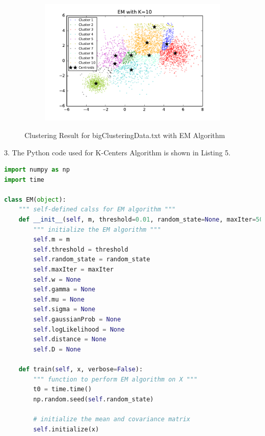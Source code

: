 \begin{description}
\begin{description}
\begin{figure}[!h]
\begin{subfigure}[b]{0.475\textwidth}
            \includegraphics[width=\textwidth]{./figures/bigClustering_EM_10.pdf}
        \end{subfigure}
        
        \caption{Clustering Result for bigClusteringData.txt with EM Algorithm}
        \label{fig:EM_bigClustering}
\end{figure}

\newpage
\item{3.} The Python code used for K-Centers Algorithm is shown in Listing 5.

\begin{lstlisting}[language=Python, caption=EM Algorithm Python Code]
import numpy as np
import time

class EM(object):
    """ self-defined calss for EM algorithm """
    def __init__(self, m, threshold=0.01, random_state=None, maxIter=500):
        """ initialize the EM algorithm """
        self.m = m
        self.threshold = threshold
        self.random_state = random_state
        self.maxIter = maxIter
        self.w = None
        self.gamma = None
        self.mu = None
        self.sigma = None
        self.gaussianProb = None
        self.logLikelihood = None
        self.distance = None
        self.D = None

    def train(self, x, verbose=False):
        """ function to perform EM algorithm on X """
        t0 = time.time()
        np.random.seed(self.random_state)

        # initialize the mean and covariance matrix
        self.initialize(x)


\end{lstlisting}
\end{description}
\end{description}

